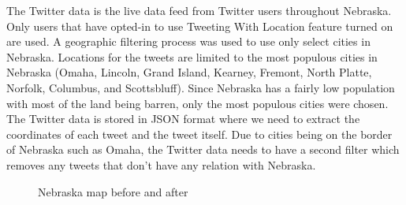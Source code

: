 \documentclass[journal]{vgtc}                %
\begin{document}
The Twitter data is the live data feed from Twitter users throughout Nebraska. Only users that have opted-in to use Tweeting With Location feature turned on are used. A geographic filtering process was used to use only select cities in Nebraska. Locations for the tweets are limited to the most populous cities in Nebraska (Omaha, Lincoln, Grand Island, Kearney, Fremont, North Platte, Norfolk, Columbus, and Scottsbluff). Since Nebraska has a fairly low population with most of the land being barren, only the most populous cities were chosen. The Twitter data is stored in JSON format where we need to extract the coordinates of each tweet and the tweet itself. Due to cities being on the border of Nebraska such as Omaha, the Twitter data needs to have a second filter which removes any tweets that don't have any relation with Nebraska.
\begin{figure}[htp]
  \centering
  \quad
\caption{Nebraska map before and after}
\label{fig:maps}
\end{figure}
\end{document}
